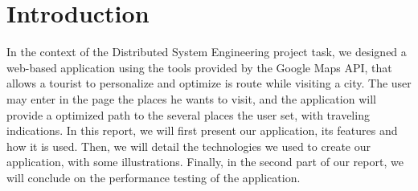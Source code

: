 \section{Introduction}

In the context of the Distributed System Engineering project task, we designed a web-based application using the tools provided by the Google Maps API, that allows a tourist to personalize and optimize is route while visiting a city. The user may enter in the page the places he wants to visit, and the application will provide a optimized path to the several places the user set, with traveling indications. In this report, we will first present our application, its features and how it is used. Then, we will detail the technologies we used to create our application, with some illustrations. Finally, in the second part of our report, we will conclude on the performance testing of the application.
	